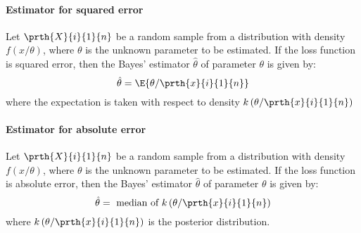 \paragraph{Estimator for squared error}
Let $\prth{X}{i}{1}{n}$ be a random sample from a distribution with 
density $f(x/\theta)$, where $\theta$ is the unknown parameter to be
estimated. If the loss function is squared error, then the Bayes'
estimator $\hat{\theta}$ of parameter $\theta$ is given by:
$$\hat{\theta}=\E{\theta/\prth{x}{i}{1}{n}}$$
where the expectation is taken with respect to density $k\left(\theta/\prth{x}{i}{1}{n}\right)$

\paragraph{Estimator for absolute error}
Let $\prth{X}{i}{1}{n}$ be a random sample from a distribution with 
density $f(x/\theta)$, where $\theta$ is the unknown parameter to be
estimated. If the loss function is absolute error, then the Bayes'
estimator $\hat{\theta}$ of parameter $\theta$ is given by:
$$\hat{\theta}=\text{ median of }k\left(\theta/\prth{x}{i}{1}{n}\right)$$
where $k\left(\theta/\prth{x}{i}{1}{n}\right)$ is the posterior distribution.
